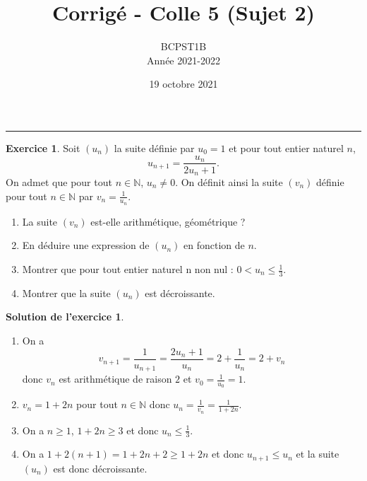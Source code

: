 \documentclass[a4paper, 11pt,openany]{article}%
\title{Corrigé - Colle 5 (Sujet 2)}
\author{BCPST1B\\
Année 2021-2022}
\date{19 octobre 2021}
\theoremstyle{plain}
\theoremstyle{definition}
\newtheorem{exo}{Exercice}
\newtheorem{sol}{Solution de l'exercice}
\theoremstyle{remark}
\newcommand{\N}{\mathbb{N}}
\begin{document}
   \maketitle
      \rule{\linewidth}{0.5mm}







\begin{exo}
Soit $(u_n)$ la suite définie par $u_0 = 1$ et pour tout entier naturel $n$, \[ u_{n+1} = \frac{u_n}{2u_n +1}.\]
On admet que pour tout $n \in \N$, $u_n \neq 0$. On définit ainsi la suite $(v_n)$ définie pour tout $n \in \N$ par $v_n = \frac{1}{u_n}$.
\begin{enumerate}
\item La suite $(v_n)$ est-elle arithmétique, géométrique ? 
\item En déduire une expression de $(u_n)$ en fonction de $n$.
\item Montrer que pour tout entier naturel n non nul : $0 < u_n \leqslant \frac{1}{3}$. 
\item Montrer que la suite $(u_n)$ est décroissante.
\end{enumerate}
\end{exo}



\begin{sol}
\begin{enumerate}
\item On a
\[ v_{n+1} = \frac{1}{u_{n+1}} = \frac{2u_n +1}{u_n} = 2 + \frac{1}{u_n} = 2 + v_n\]
donc $v_n$ est arithmétique de raison $2$ et $v_0 = \frac{1}{u_0} = 1$.
\item $v_n = 1 + 2n$ pour tout $n \in \N$ donc $u_n = \frac{1}{v_n} = \frac{1}{1 + 2n}$.
\item On a $n \geqslant 1$, $1 + 2n \geqslant 3$ et donc $u_n \leqslant \frac{1}{3}$.
\item On a $1 + 2 (n+1) = 1 + 2n + 2 \geqslant 1 +2n$ et donc $u_{n+1} \leqslant u_n$ et la suite $(u_n)$ est donc décroissante.
\end{enumerate}
\end{sol}
\end{document}

